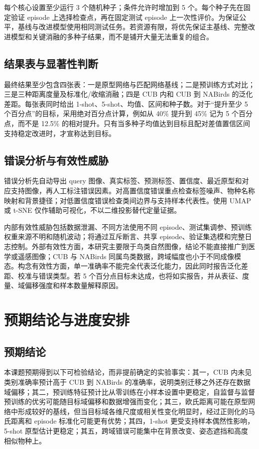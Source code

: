 \documentclass[UTF8,zihao=-4,scheme=chinese]{ctexart}
\begin{document}
每个核心设置至少运行 3 个随机种子；条件允许时增加到 5 个。每个种子先在固定验证 episode 上选择检查点，再在固定测试 episode 上一次性评价。为保证公平，基线与改进模型使用相同测试任务。若资源有限，将优先保证主基线、完整改进模型和关键消融的多种子结果，而不是铺开大量无法重复的组合。

\subsection{结果表与显著性判断}

最终结果至少包含四张表：一是原型网络与匹配网络基线；二是预训练方式对比；三是三种距离度量及标准化/收缩消融；四是 CUB 内和 CUB 到 NABirds 的泛化差距。每张表同时给出 1-shot、5-shot、均值、区间和种子数。对于“提升至少 5 个百分点”的目标，采用绝对百分点计算，例如从 40\% 提升到 45\% 记为 5 个百分点，而不是 12.5\% 的相对提升。只有当多种子均值达到目标且配对差值置信区间支持稳定改进时，才宣称达到目标。

\subsection{错误分析与有效性威胁}

错误分析先自动导出 query 图像、真实标签、预测标签、置信度、最近原型和对应支持图像，再人工标注错误因素。对高置信度错误重点检查标签噪声、物种名称映射和背景捷径；对低置信度错误检查类间边界与支持样本代表性。使用 UMAP 或 t-SNE 仅作辅助可视化，不以二维投影替代定量证据。

内部有效性威胁包括数据泄漏、不同方法使用不同 episode、测试集调参、预训练权重来源不明和随机波动；将通过互斥断言、共享 episode、验证集选模和完整日志控制。外部有效性方面，本研究主要限于鸟类自然图像，结论不能直接推广到医学或遥感图像；CUB 与 NABirds 同属鸟类数据，跨域幅度也小于不同成像模态。构念有效性方面，单一准确率不能完全代表泛化能力，因此同时报告泛化差距、校准与错误类型。若 5 个百分点目标未达成，也将如实报告，并从表征、度量、域偏移强度和样本数量解释原因。

\section{预期结论与进度安排}

\subsection{预期结论}

本课题预期得到以下可检验结论，而非提前确定的实验事实：其一，CUB 内未见类别准确率预计高于 CUB 到 NABirds 的准确率，说明类别迁移之外还存在数据域偏移；其二，预训练特征预计比从零训练在小样本设置中更稳定，自监督与监督预训练的优劣可能随目标域偏移和数据增强而变化；其三，欧氏距离可能在原型网络中形成较好的基线，但当目标域各维尺度或相关性变化明显时，经过正则化的马氏距离和 episode 标准化可能更有优势；其四，1-shot 更受支持样本偶然性影响，5-shot 原型估计更稳定；其五，跨域错误可能集中在背景改变、姿态遮挡和高度相似物种上。
\end{document}
